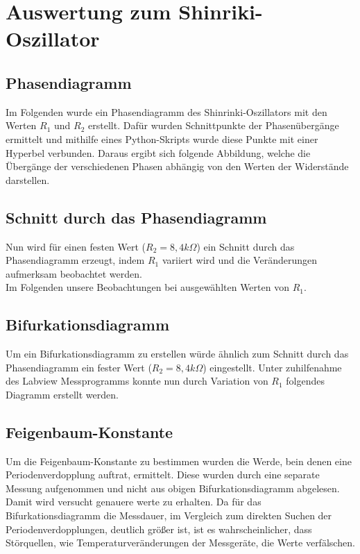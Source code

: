 \section{Auswertung zum Shinriki-Oszillator}

\subsection{Phasendiagramm}
Im Folgenden wurde ein Phasendiagramm des Shinrinki-Oszillators mit den Werten \(R_1\) und \(R_2\) erstellt. Dafür wurden Schnittpunkte der Phasenübergänge ermittelt und mithilfe eines Python-Skripts wurde diese Punkte mit einer Hyperbel verbunden. Daraus ergibt sich folgende Abbildung, welche die Übergänge der verschiedenen Phasen abhängig von den Werten der Widerstände darstellen.

\subsection{Schnitt durch das Phasendiagramm}
Nun wird für einen festen Wert (\(R_2 = 8,4 k\Omega\)) ein Schnitt durch das Phasendiagramm erzeugt, indem \(R_1\) variiert wird und die Veränderungen aufmerksam beobachtet werden. \\
Im Folgenden unsere Beobachtungen bei ausgewählten Werten von \(R_1\).

\subsection{Bifurkationsdiagramm}
Um ein Bifurkationsdiagramm zu erstellen würde ähnlich zum Schnitt durch das Phasendiagramm ein fester Wert (\(R_2=8,4k \Omega\)) eingestellt. Unter zuhilfenahme des Labview Messprogramms konnte nun durch Variation von \(R_1\) folgendes Diagramm erstellt werden.



\subsection{Feigenbaum-Konstante}

Um die Feigenbaum-Konstante zu bestimmen wurden die Werde, bein denen eine Periodenverdopplung auftrat, ermittelt. Diese wurden durch eine separate Messung aufgenommen und nicht aus obigen Bifurkationsdiagramm abgelesen. Damit wird versucht genauere werte zu erhalten. Da für das Bifurkationsdiagramm die Messdauer, im Vergleich zum direkten Suchen der Periodenverdopplungen, deutlich größer ist, ist es wahrscheinlicher, dass Störquellen, wie Temperaturveränderungen der Messgeräte, die Werte verfälschen.\\

